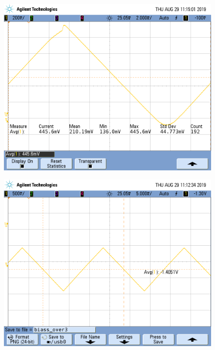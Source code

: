 \begin{figure}[H]
\centering
\begin{minipage}{.5\textwidth}
  \centering
  \includegraphics[width=.99\linewidth]{imagenes/RS2CORTOLF356capa.png}
  \label{fig:ib+}
\end{minipage}%
\begin{minipage}{.5\textwidth}
  \centering
  \includegraphics[width=.99\linewidth]{imagenes/RS1CORTOLF356capa.png}
  \label{fig:ib-}
\end{minipage}
\end{figure}

